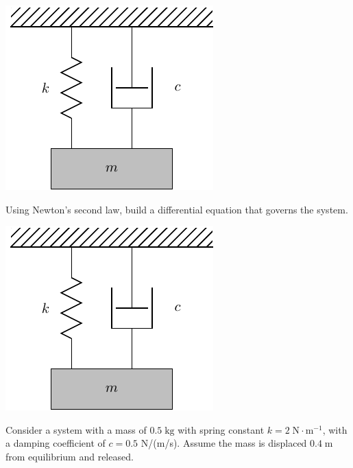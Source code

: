 \includegraphics[width=0.4\linewidth]{graphics/notes_08_hanging_mass}

\newpage

\problem Using Newton's second law, build a differential equation that
governs the system.

\includegraphics[width=0.4\linewidth]{graphics/notes_08_hanging_mass}




\newpage
\problem Consider a system with a mass of $0.5 \; \text{kg}$ with
spring constant $k = 2 \; \text{N} \cdot \text{m}^{-1}$, with a
damping coefficient of $c = 0.5$ N/(m/s).  Assume the mass is
displaced $0.4 \; \text{m}$ from equilibrium and released.

